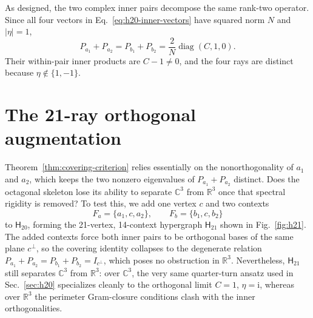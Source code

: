 \documentclass[twocolumn,aps,pra,floatfix,amsmath,amssymb,longbibliography]{revtex4-2}
\newenvironment{handrewrite}{\leavevmode\color{blue}}{}
\theoremstyle{definition}
\theoremstyle{remark}
\newcommand{\ii}{\mathrm{i}}
\newcommand{\C}{\mathbb C}
\newcommand{\R}{\mathbb R}
\newcommand{\Htwenty}{\mathsf H_{20}}
\newcommand{\Htwentyone}{\mathsf H_{21}}
\begin{document}
As designed, the two complex inner pairs decompose the same rank-two
operator.  Since all four vectors in Eq.~\eqref{eq:h20-inner-vectors} have
squared norm $N$ and $|\eta|=1$,
\begin{equation}
 P_{a_1}+P_{a_2}=P_{b_1}+P_{b_2}
 =\frac{2}{N}\operatorname{diag}(C,1,0).
 \label{eq:complex-two-sum}
\end{equation}
Their within-pair inner products are $C-1\ne0$, and the four rays are
distinct because $\eta\notin\{1,-1\}$.

\section{The 21-ray orthogonal augmentation}
\label{sec:h21}

\begin{handrewrite}
Theorem~\ref{thm:covering-criterion} relies essentially on the nonorthogonality
of $a_1$ and $a_2$, which keeps the two nonzero eigenvalues of
$P_{a_1}+P_{a_2}$ distinct.  Does the octagonal skeleton lose its ability to
separate $\C^3$ from $\R^3$ once that spectral rigidity is removed?  To test
this, we add one vertex $c$ and two contexts
\begin{equation}
 F_a=\{a_1,c,a_2\},\qquad F_b=\{b_1,c,b_2\}
 \label{eq:added-contexts}
\end{equation}
to $\Htwenty$, forming the 21-vertex, 14-context hypergraph $\Htwentyone$
shown in Fig.~\ref{fig:h21}.  The added contexts force both inner pairs to be
orthogonal bases of the same plane $c^\perp$, so the covering identity
collapses to the degenerate relation $P_{a_1}+P_{a_2}=P_{b_1}+P_{b_2}=I_{c^\perp}$,
which poses no obstruction in $\R^3$.  Nevertheless, $\Htwentyone$ still
separates $\C^3$ from $\R^3$: over $\C^3$, the very same quarter-turn ansatz
used in Sec.~\ref{sec:h20} specializes cleanly to the orthogonal limit $C=1$,
$\eta=\ii$, whereas over $\R^3$ the perimeter Gram-closure conditions clash
with the inner orthogonalities.
\end{handrewrite}
\end{document}
